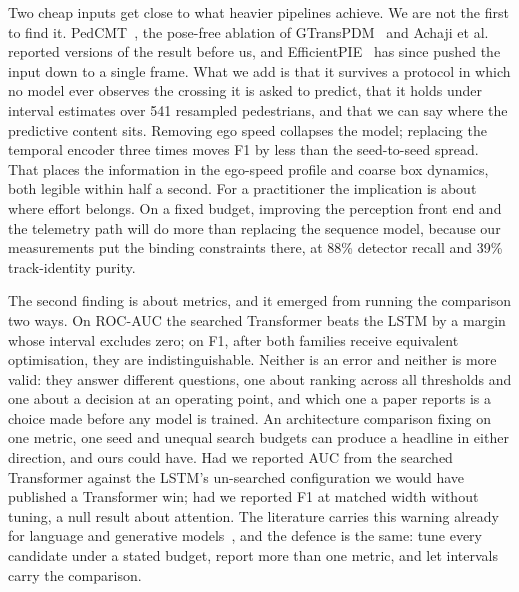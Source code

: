 \documentclass[mti,article,submit,moreauthors]{Definitions/mdpi}
\begin{document}
Two cheap inputs get close to what heavier pipelines achieve. We are not the first to find it. PedCMT~\citep{chen2024pedcmt}, the pose-free ablation of GTransPDM~\citep{xie2025gtranspdm} and Achaji et al.~\citep{achaji2022attention} reported versions of the result before us, and EfficientPIE~\citep{qu2025efficientpie} has since pushed the input down to a single frame. What we add is that it survives a protocol in which no model ever observes the crossing it is asked to predict, that it holds under interval estimates over 541 resampled pedestrians, and that we can say where the predictive content sits. Removing ego speed collapses the model; replacing the temporal encoder three times moves F1 by less than the seed-to-seed spread. That places the information in the ego-speed profile and coarse box dynamics, both legible within half a second. For a practitioner the implication is about where effort belongs. On a fixed budget, improving the perception front end and the telemetry path will do more than replacing the sequence model, because our measurements put the binding constraints there, at 88\% detector recall and 39\% track-identity purity.

The second finding is about metrics, and it emerged from running the comparison two ways. On ROC-AUC the searched Transformer beats the LSTM by a margin whose interval excludes zero; on F1, after both families receive equivalent optimisation, they are indistinguishable. Neither is an error and neither is more valid: they answer different questions, one about ranking across all thresholds and one about a decision at an operating point, and which one a paper reports is a choice made before any model is trained. An architecture comparison fixing on one metric, one seed and unequal search budgets can produce a headline in either direction, and ours could have. Had we reported AUC from the searched Transformer against the LSTM's un-searched configuration we would have published a Transformer win; had we reported F1 at matched width without tuning, a null result about attention. The literature carries this warning already for language and generative models~\citep{melis2018sota,lucic2018gans}, and the defence is the same: tune every candidate under a stated budget, report more than one metric, and let intervals carry the comparison.
\end{document}
